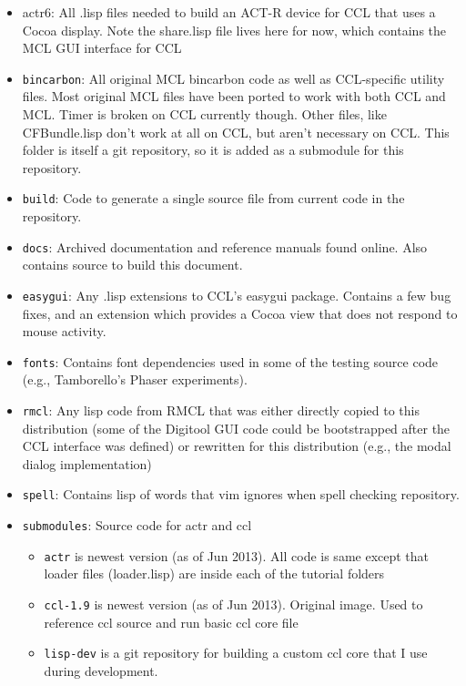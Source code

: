 \documentclass[12pt]{article} %
\newcommand{\filesys}[1]{\texttt{#1}}
\begin{document}
\begin{itemize}
  \item actr6: All .lisp files needed to build an ACT-R device for CCL that uses a Cocoa display. Note the share.lisp file lives here for now, which contains the MCL GUI interface for CCL
  \item \filesys{bincarbon}:
    All original MCL bincarbon code as well as CCL-specific utility files. 
    Most original MCL files have been ported to work with both CCL and MCL.
    Timer is broken on CCL currently though.
    Other files, like CFBundle.lisp don't work at all on CCL, but aren't necessary on CCL.
    This folder is itself a git repository, so it is added as a submodule for this repository.
  \item \filesys{build}: Code to generate a single source file from current code in the repository.
  \item \filesys{docs}:
    Archived documentation and reference manuals found online.
    Also contains source to build this document.
  \item \filesys{easygui}:
    Any .lisp extensions to CCL's easygui package.
    Contains a few bug fixes, and an extension which provides a Cocoa view that does not respond to mouse activity.
  \item \filesys{fonts}: Contains font dependencies used in some of the testing source code (e.g., Tamborello's Phaser experiments).
  \item \filesys{rmcl}:
    Any lisp code from RMCL that was either directly copied to this distribution (some of the Digitool GUI code could be bootstrapped after the CCL interface was defined)
    or rewritten for this distribution (e.g., the modal dialog implementation)
  \item \filesys{spell}: Contains lisp of words that vim ignores when spell checking repository.
  \item \filesys{submodules}: Source code for actr and ccl
    \begin{itemize}
      \item \filesys{actr} is newest version (as of Jun 2013). All code is same except that loader files (loader.lisp) are inside each of the tutorial folders
      \item \filesys{ccl-1.9} is newest version (as of Jun 2013). Original image. Used to reference ccl source and run basic ccl core file
      \item \filesys{lisp-dev} is a git repository for building a custom ccl core that I use during development.

\end{itemize}
\end{itemize}
\end{document}
